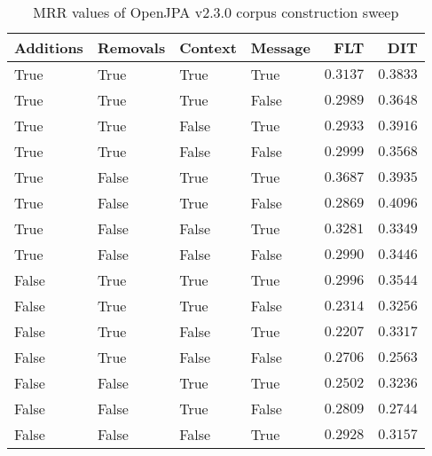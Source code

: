 
\begin{table}
\begin{spacing}{1.2}
\centering
\caption{MRR values of OpenJPA v2.3.0 corpus construction sweep}
\label{table:openjpa_corpus_sweep}
\vspace{0.2em}
\begin{tabular}{llll|rr}
\toprule
Additions & Removals & Context & Message & FLT &        DIT \\
\midrule
     True &     True &    True &    True &         $0.3137$ &      $0.3833$ \\
     \myrowcolor True &     True &    True &   False &         $0.2989$ &      $0.3648$ \\
     True &     True &   False &    True &         $0.2933$ &      $0.3916$ \\
     True &     True &   False &   False &         $0.2999$ &      $0.3568$ \\
     True &    False &    True &    True &    $\bm{0.3687}$ &      $0.3935$ \\
     True &    False &    True &   False &         $0.2869$ & $\bm{0.4096}$ \\
     True &    False &   False &    True &         $0.3281$ &      $0.3349$ \\
     True &    False &   False &   False &         $0.2990$ &      $0.3446$ \\
    False &     True &    True &    True &         $0.2996$ &      $0.3544$ \\
    False &     True &    True &   False &         $0.2314$ &      $0.3256$ \\
    False &     True &   False &    True &         $0.2207$ &      $0.3317$ \\
    False &     True &   False &   False &         $0.2706$ &      $0.2563$ \\
    False &    False &    True &    True &         $0.2502$ &      $0.3236$ \\
    False &    False &    True &   False &         $0.2809$ &      $0.2744$ \\
    False &    False &   False &    True &         $0.2928$ &      $0.3157$ \\
\bottomrule
\end{tabular}

\end{spacing}
\end{table}
